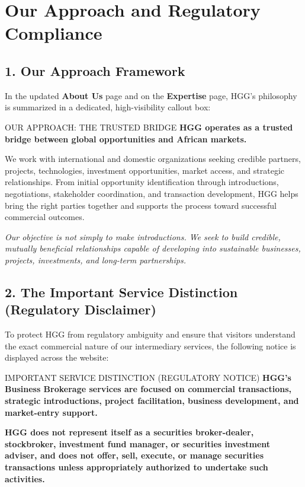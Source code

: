 \documentclass[11pt,a4paper]{article}
\begin{document}
\newpage

\section{Our Approach and Regulatory Compliance}

\subsection{1. Our Approach Framework}
In the updated \textbf{About Us} page and on the \textbf{Expertise} page, HGG's philosophy is summarized in a dedicated, high-visibility callout box:

\begin{ApproachBox}{OUR APPROACH: THE TRUSTED BRIDGE}
\textbf{HGG operates as a trusted bridge between global opportunities and African markets.}

We work with international and domestic organizations seeking credible partners, projects, technologies, investment opportunities, market access, and strategic relationships. From initial opportunity identification through introductions, negotiations, stakeholder coordination, and transaction development, HGG helps bring the right parties together and supports the process toward successful commercial outcomes.

\vspace{0.1cm}
\textit{Our objective is not simply to make introductions. We seek to build credible, mutually beneficial relationships capable of developing into sustainable businesses, projects, investments, and long-term partnerships.}
\end{ApproachBox}

\vspace{0.1cm}

\subsection{2. The Important Service Distinction (Regulatory Disclaimer)}
To protect HGG from regulatory ambiguity and ensure that visitors understand the exact commercial nature of our intermediary services, the following notice is displayed across the website:

\begin{NoticeBox}{IMPORTANT SERVICE DISTINCTION (REGULATORY NOTICE)}
\textbf{HGG's Business Brokerage services are focused on commercial transactions, strategic introductions, project facilitation, business development, and market-entry support.}

\vspace{0.1cm}
\textbf{HGG does not represent itself as a securities broker-dealer, stockbroker, investment fund manager, or securities investment adviser, and does not offer, sell, execute, or manage securities transactions unless appropriately authorized to undertake such activities.}
\end{NoticeBox}
\end{document}
